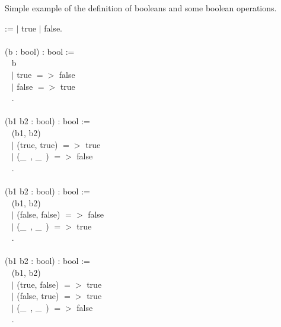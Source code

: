 
Simple example of the definition of booleans and some boolean operations.

\begin{code}
\Inductive {} :=
  $\mid$ true
  $\mid$ false.
\\ \\
\Definition {} (b : bool) : bool :=		\\ \-\ \quad
  \match b \with							\\ \-\ \quad
   $\mid$ true $=>$ false					\\ \-\ \quad
   $\mid$ false $=>$ true					\\ \-\ \quad
  \End.
\\ \\
\Definition {} (b1 b2 : bool) : bool :=	\\ \-\ \quad
  \match (b1, b2) \with					\\ \-\ \quad
   $\mid$ (true, true) $=>$ true				\\ \-\ \quad
   $\mid$ (\_\ , \_\ ) $=>$ false				\\ \-\ \quad
  \End.
\\ \\
\Definition {} (b1 b2 : bool) : bool :=		\\ \-\ \quad
  \match (b1, b2) \with					\\ \-\ \quad
   $\mid$ (false, false) $=>$ false			\\ \-\ \quad
   $\mid$ (\_\ , \_\ ) $=>$ true				\\ \-\ \quad
  \End.
\\ \\
\Definition {} (b1 b2 : bool) : bool :=		\\ \-\ \quad
  \match (b1, b2) \with					\\ \-\ \quad
   $\mid$ (true, false) $=>$ true				\\ \-\ \quad
   $\mid$ (false, true) $=>$ true				\\ \-\ \quad
   $\mid$ (\_\ , \_\ ) $=>$ false				\\ \-\ \quad
  \End.
\end{code}


